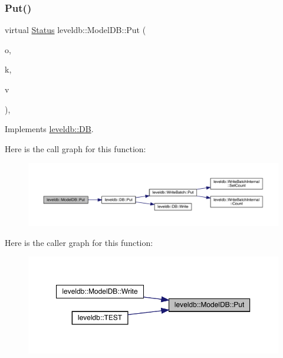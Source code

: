 \subsubsection{\texorpdfstring{Put()}{Put()}}
{\footnotesize\ttfamily virtual \mbox{\hyperlink{classleveldb_1_1_status}{Status}} leveldb\+::\+Model\+D\+B\+::\+Put (\begin{DoxyParamCaption}\item[{const \mbox{\hyperlink{structleveldb_1_1_write_options}{Write\+Options}} \&}]{o,  }\item[{const \mbox{\hyperlink{classleveldb_1_1_slice}{Slice}} \&}]{k,  }\item[{const \mbox{\hyperlink{classleveldb_1_1_slice}{Slice}} \&}]{v }\end{DoxyParamCaption})\hspace{0.3cm}{\ttfamily [inline]}, {\ttfamily [virtual]}}



Implements \mbox{\hyperlink{classleveldb_1_1_d_b_ac2e472812630ed74298df7b03b08c1ae}{leveldb\+::\+DB}}.

Here is the call graph for this function\+:
\nopagebreak
\begin{figure}[H]
\begin{center}
\leavevmode
\includegraphics[width=350pt]{classleveldb_1_1_model_d_b_a83d0ace11c8ff079f4e6eaa905744253_cgraph}
\end{center}
\end{figure}
Here is the caller graph for this function\+:
\nopagebreak
\begin{figure}[H]
\begin{center}
\leavevmode
\includegraphics[width=350pt]{classleveldb_1_1_model_d_b_a83d0ace11c8ff079f4e6eaa905744253_icgraph}
\end{center}
\end{figure}
\mbox{\label{classleveldb_1_1_model_d_b_a3f5d86ce612baaa88c11601c9a59df12}} 
